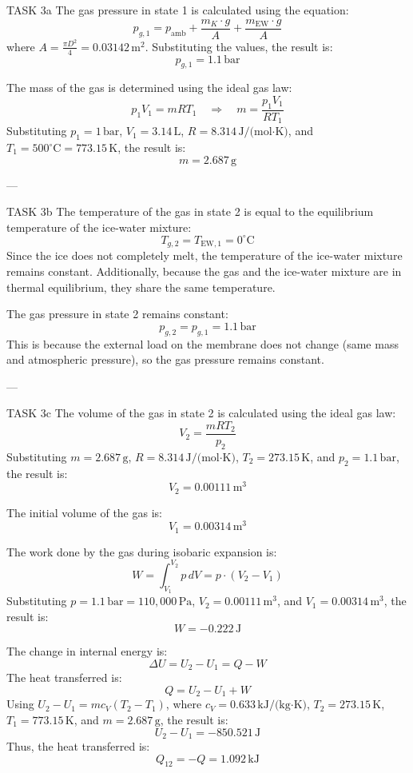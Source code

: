 TASK 3a  
The gas pressure in state 1 is calculated using the equation:  
\[
p_{g,1} = p_{\text{amb}} + \frac{m_K \cdot g}{A} + \frac{m_{\text{EW}} \cdot g}{A}
\]  
where \( A = \frac{\pi D^2}{4} = 0.03142 \, \text{m}^2 \).  
Substituting the values, the result is:  
\[
p_{g,1} = 1.1 \, \text{bar}
\]  

The mass of the gas is determined using the ideal gas law:  
\[
p_1 V_1 = m R T_1 \quad \Rightarrow \quad m = \frac{p_1 V_1}{R T_1}
\]  
Substituting \( p_1 = 1 \, \text{bar} \), \( V_1 = 3.14 \, \text{L} \), \( R = 8.314 \, \text{J/(mol·K)} \), and \( T_1 = 500^\circ\text{C} = 773.15 \, \text{K} \), the result is:  
\[
m = 2.687 \, \text{g}
\]  

---

TASK 3b  
The temperature of the gas in state 2 is equal to the equilibrium temperature of the ice-water mixture:  
\[
T_{g,2} = T_{\text{EW},1} = 0^\circ\text{C}
\]  
Since the ice does not completely melt, the temperature of the ice-water mixture remains constant. Additionally, because the gas and the ice-water mixture are in thermal equilibrium, they share the same temperature.  

The gas pressure in state 2 remains constant:  
\[
p_{g,2} = p_{g,1} = 1.1 \, \text{bar}
\]  
This is because the external load on the membrane does not change (same mass and atmospheric pressure), so the gas pressure remains constant.  

---

TASK 3c  
The volume of the gas in state 2 is calculated using the ideal gas law:  
\[
V_2 = \frac{m R T_2}{p_2}
\]  
Substituting \( m = 2.687 \, \text{g} \), \( R = 8.314 \, \text{J/(mol·K)} \), \( T_2 = 273.15 \, \text{K} \), and \( p_2 = 1.1 \, \text{bar} \), the result is:  
\[
V_2 = 0.00111 \, \text{m}^3
\]  

The initial volume of the gas is:  
\[
V_1 = 0.00314 \, \text{m}^3
\]  

The work done by the gas during isobaric expansion is:  
\[
W = \int_{V_1}^{V_2} p \, dV = p \cdot (V_2 - V_1)
\]  
Substituting \( p = 1.1 \, \text{bar} = 110,000 \, \text{Pa} \), \( V_2 = 0.00111 \, \text{m}^3 \), and \( V_1 = 0.00314 \, \text{m}^3 \), the result is:  
\[
W = -0.222 \, \text{J}
\]  

The change in internal energy is:  
\[
\Delta U = U_2 - U_1 = Q - W
\]  
The heat transferred is:  
\[
Q = U_2 - U_1 + W
\]  
Using \( U_2 - U_1 = m c_V (T_2 - T_1) \), where \( c_V = 0.633 \, \text{kJ/(kg·K)} \), \( T_2 = 273.15 \, \text{K} \), \( T_1 = 773.15 \, \text{K} \), and \( m = 2.687 \, \text{g} \), the result is:  
\[
U_2 - U_1 = -850.521 \, \text{J}
\]  
Thus, the heat transferred is:  
\[
Q_{12} = -Q = 1.092 \, \text{kJ}
\]  